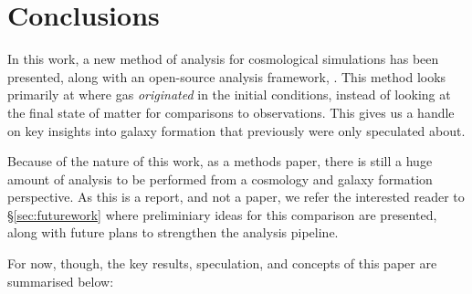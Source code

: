 \section{Conclusions}
\label{sec:conclusions}

In this work, a new method of analysis for cosmological simulations has
been presented, along with an open-source analysis framework,
\ltcaesar{}. This method looks primarily at where gas \emph{originated}
in the initial conditions, instead of looking at the final state
of matter for comparisons to observations. This gives us a handle on
key insights into galaxy formation that previously were only speculated
about.

Because of the nature of this work, as a methods paper, there is still
a huge amount of analysis to be performed from a cosmology and galaxy
formation perspective. As this is a report, and not a paper, we refer
the interested reader to \S \ref{sec:futurework} where preliminiary ideas
for this comparison are presented, along with future plans to strengthen
the analysis pipeline.

For now, though, the key results, speculation, and concepts of this paper are
summarised below:

